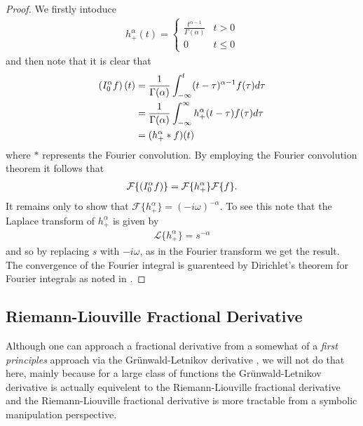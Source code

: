 \begin{proof}
    We firstly intoduce
    \begin{align}
        h_+^\alpha(t) = \begin{cases}
            \frac{t^{\alpha-1}}{\Gamma(\alpha)} & t > 0 \\
            0   & t \leq 0
        \end{cases} 
    \end{align} and then note that it is clear that
    \begin{align}
        \left( I_{0}^{\alpha} f \right)(t) &= \frac{1}{\Gamma(\alpha)} \int_{-\infty}^t (t-\tau)^{\alpha-1} f(\tau)d\tau \\
            &= \frac{1}{\Gamma(\alpha)} \int_{-\infty}^\infty h_+^\alpha(t-\tau)f(\tau)d\tau \\
            &= (h_+^\alpha * f)(t)
    \end{align}
    where $ * $ represents the Fourier convolution.
    By employing the Fourier convolution theorem it follows that
    \begin{align}
         \mathcal{F}\{ \left( I_{0}^{\alpha} f \right) \} = \mathcal{F}\{ h_+^\alpha \}\mathcal{F}\{f\}.
    \end{align}
    It remains only to show that $ \mathcal{F}\{h_+^\alpha\} = (-i\omega)^{-\alpha} $. To see this note that the Laplace transform of $ h_+^\alpha $ is given by
    \begin{align}
        \mathcal{L}\{h_+^\alpha\} = s^{-\alpha} 
    \end{align}
    and so by replacing $ s $ with $ -i\omega $, as in the Fourier transform we get the result. The convergence of the Fourier integral is guarenteed by Dirichlet's theorem for Fourier integrals as noted in \cite{Podlubny1999}. 
\end{proof}
\subsection{Riemann-Liouville Fractional Derivative}
Although one can approach a fractional derivative from a somewhat of a \emph{first principles} approach via the Gr{\"u}nwald-Letnikov derivative \cite{Podlubny1999, Samko1993}, we will not do that here, mainly because for a large class of functions the Gr{\"u}nwald-Letnikov derivative is actually equivelent to the Riemann-Liouville fractional derivative \cite{Podlubny1999} and the Riemann-Liouville fractional derivative is more tractable from a symbolic manipulation perspective.

